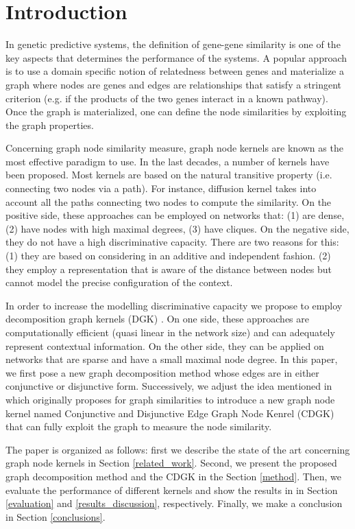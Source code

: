 \documentclass{esannV2}
\begin{document}
\section{Introduction} \label{introduction}
In genetic predictive systems, the definition of gene-gene similarity is one of the key aspects that determines the performance of the systems. A popular approach is to use a domain specific notion of relatedness between genes and materialize a graph where nodes are genes and edges are relationships that satisfy a stringent criterion (e.g. if the products of the two genes interact in a known pathway). 
Once the graph is materialized, one can define the node similarities by exploiting the graph properties.

Concerning graph node similarity measure, graph node kernels are known as the most effective paradigm to use. In the last decades, a number of kernels have been proposed. Most kernels are based on the natural transitive property (i.e. connecting two nodes via a path). For instance, diffusion kernel takes into account all the paths connecting two nodes to compute the similarity. On the positive side, these approaches can be employed on networks that: (1) are dense, (2) have nodes with high maximal degrees, (3) have cliques. On the negative side, they do not have a high discriminative capacity. There are two reasons for this: (1) they are based on considering in an additive and independent fashion. (2) they employ a representation that is aware of the distance between nodes but cannot model the precise configuration of the context.

In order to increase the modelling discriminative capacity we propose to employ decomposition graph kernels (DGK) \cite{covolution_kernel}. On one side, these approaches are computationally efficient (quasi linear in the network size) and can adequately represent contextual information. On the other side, they can be applied on networks that are sparse and have a small maximal node degree. In this paper, we first pose a new graph decomposition method whose edges are in either conjunctive or disjunctive form. Successively, we adjust the idea mentioned in \cite{nspdk} which originally proposes for graph similarities to introduce a new graph node kernel named Conjunctive and Disjunctive Edge Graph Node Kenrel (CDGK) that can fully exploit the graph to measure the node similarity.

The paper is organized as follows: first we describe the state of the art concerning graph node kernels in Section \ref{related_work}. Second, we present the proposed graph decomposition method and the CDGK in the Section \ref{method}. Then, we evaluate the performance of different kernels and show the results in in Section \ref{evaluation} and \ref{results_discussion}, respectively. Finally, we make a conclusion in Section \ref{conclusions}.
\end{document}
